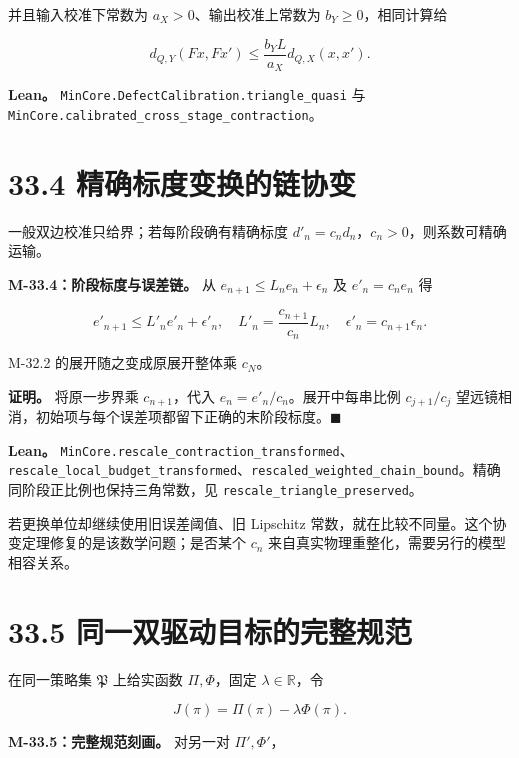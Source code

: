 \documentclass[
  11pt,
  oneside]{book}
\begin{document}
并且输入校准下常数为 \(a_X>0\)、输出校准上常数为 \(b_Y\ge0\)，相同计算给

\[d_{Q,Y}(Fx,Fx')\le\frac{b_YL}{a_X}d_{Q,X}(x,x').\]

\textbf{Lean。} \nolinkurl{MinCore.DefectCalibration.triangle_quasi} 与 \nolinkurl{MinCore.calibrated_cross_stage_contraction}。

\section{33.4 精确标度变换的链协变}\label{ux7cbeux786eux6807ux5ea6ux53d8ux6362ux7684ux94feux534fux53d8}

一般双边校准只给界；若每阶段确有精确标度 \(d'_n=c_nd_n\)，\(c_n>0\)，则系数可精确运输。

\hypertarget{m-33-4}{}\label{m-33-4}

\textbf{M-33.4：阶段标度与误差链。} 从 \(e_{n+1}\le L_ne_n+\epsilon_n\) 及 \(e'_n=c_ne_n\) 得

\[e'_{n+1}\le L'_ne'_n+\epsilon'_n,
\quad L'_n=\frac{c_{n+1}}{c_n}L_n,
\quad\epsilon'_n=c_{n+1}\epsilon_n.\]

M-32.2 的展开随之变成原展开整体乘 \(c_N\)。

\textbf{证明。} 将原一步界乘 \(c_{n+1}\)，代入 \(e_n=e'_n/c_n\)。展开中每串比例 \(c_{j+1}/c_j\) 望远镜相消，初始项与每个误差项都留下正确的末阶段标度。\(\blacksquare\)

\textbf{Lean。} \nolinkurl{MinCore.rescale_contraction_transformed}、\nolinkurl{rescale_local_budget_transformed}、\nolinkurl{rescaled_weighted_chain_bound}。精确同阶段正比例也保持三角常数，见 \nolinkurl{rescale_triangle_preserved}。

若更换单位却继续使用旧误差阈值、旧 Lipschitz 常数，就在比较不同量。这个协变定理修复的是该数学问题；是否某个 \(c_n\) 来自真实物理重整化，需要另行的模型相容关系。

\section{33.5 同一双驱动目标的完整规范}\label{ux540cux4e00ux53ccux9a71ux52a8ux76eeux6807ux7684ux5b8cux6574ux89c4ux8303}

在同一策略集 \(\mathfrak P\) 上给实函数 \(\Pi,\Phi\)，固定 \(\lambda\in\mathbb R\)，令

\[J(\pi)=\Pi(\pi)-\lambda\Phi(\pi).\]

\hypertarget{m-33-5}{}\label{m-33-5}

\textbf{M-33.5：完整规范刻画。} 对另一对 \(\Pi',\Phi'\)，
\end{document}
